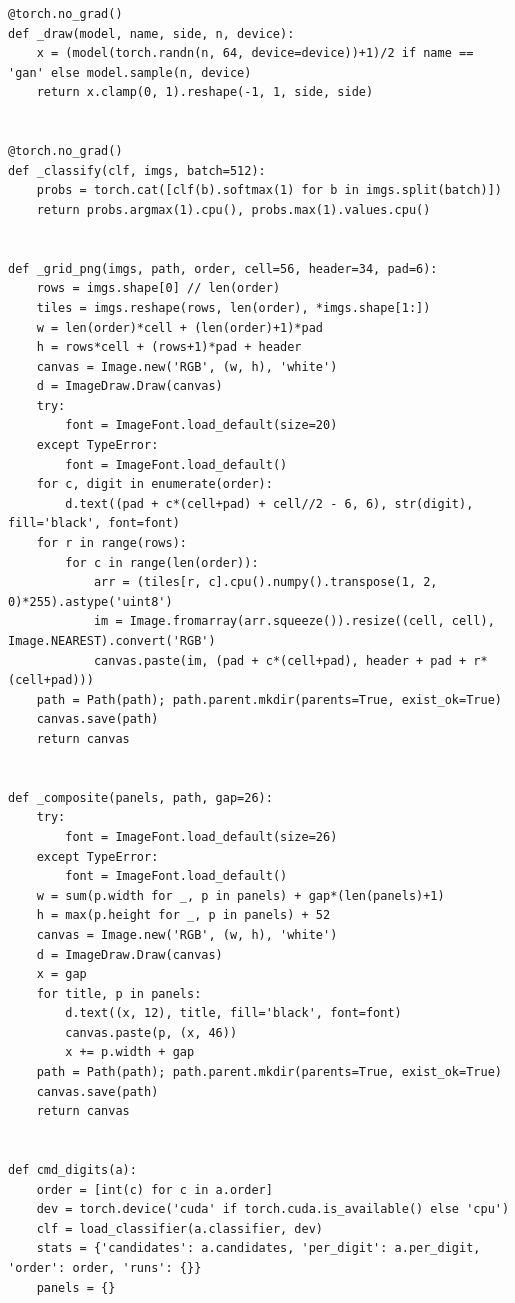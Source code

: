 \begin{lstlisting}
@torch.no_grad()
def _draw(model, name, side, n, device):
    x = (model(torch.randn(n, 64, device=device))+1)/2 if name == 'gan' else model.sample(n, device)
    return x.clamp(0, 1).reshape(-1, 1, side, side)


@torch.no_grad()
def _classify(clf, imgs, batch=512):
    probs = torch.cat([clf(b).softmax(1) for b in imgs.split(batch)])
    return probs.argmax(1).cpu(), probs.max(1).values.cpu()


def _grid_png(imgs, path, order, cell=56, header=34, pad=6):
    rows = imgs.shape[0] // len(order)
    tiles = imgs.reshape(rows, len(order), *imgs.shape[1:])
    w = len(order)*cell + (len(order)+1)*pad
    h = rows*cell + (rows+1)*pad + header
    canvas = Image.new('RGB', (w, h), 'white')
    d = ImageDraw.Draw(canvas)
    try:
        font = ImageFont.load_default(size=20)
    except TypeError:
        font = ImageFont.load_default()
    for c, digit in enumerate(order):
        d.text((pad + c*(cell+pad) + cell//2 - 6, 6), str(digit), fill='black', font=font)
    for r in range(rows):
        for c in range(len(order)):
            arr = (tiles[r, c].cpu().numpy().transpose(1, 2, 0)*255).astype('uint8')
            im = Image.fromarray(arr.squeeze()).resize((cell, cell), Image.NEAREST).convert('RGB')
            canvas.paste(im, (pad + c*(cell+pad), header + pad + r*(cell+pad)))
    path = Path(path); path.parent.mkdir(parents=True, exist_ok=True)
    canvas.save(path)
    return canvas


def _composite(panels, path, gap=26):
    try:
        font = ImageFont.load_default(size=26)
    except TypeError:
        font = ImageFont.load_default()
    w = sum(p.width for _, p in panels) + gap*(len(panels)+1)
    h = max(p.height for _, p in panels) + 52
    canvas = Image.new('RGB', (w, h), 'white')
    d = ImageDraw.Draw(canvas)
    x = gap
    for title, p in panels:
        d.text((x, 12), title, fill='black', font=font)
        canvas.paste(p, (x, 46))
        x += p.width + gap
    path = Path(path); path.parent.mkdir(parents=True, exist_ok=True)
    canvas.save(path)
    return canvas


def cmd_digits(a):
    order = [int(c) for c in a.order]
    dev = torch.device('cuda' if torch.cuda.is_available() else 'cpu')
    clf = load_classifier(a.classifier, dev)
    stats = {'candidates': a.candidates, 'per_digit': a.per_digit, 'order': order, 'runs': {}}
    panels = {}


\end{lstlisting}
